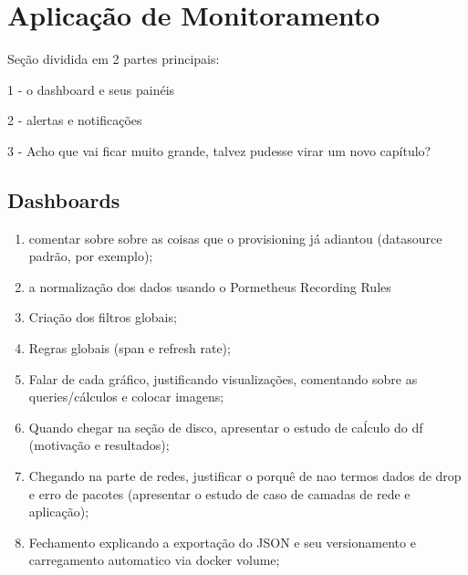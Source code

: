 \chapter{Aplicação de Monitoramento}
\label{chap4}

{\color{blue}
Seção dividida em 2 partes principais:

1 - o dashboard e seus painéis

2 - alertas e notificações

3 - Acho que vai ficar muito grande, talvez pudesse virar um novo capítulo?

\section{Dashboards}
\label{section:Dashboards}

\begin{enumerate}  
  \item comentar sobre sobre as coisas que o provisioning já adiantou (datasource padrão, por exemplo);
  \item a normalização dos dados usando o Pormetheus Recording Rules
  \item Criação dos filtros globais;
  \item Regras globais (span e refresh rate);
  \item Falar de cada gráfico, justificando visualizações, comentando sobre as queries/cálculos e colocar imagens;
  \item Quando chegar na seção de disco, apresentar o estudo de caĺculo do df (motivação e resultados);
  \item Chegando na parte de redes, justificar o porquê de nao termos dados de drop e erro de pacotes (apresentar o estudo de caso de camadas de rede e aplicação);
  \item Fechamento explicando a exportação do JSON e seu versionamento e carregamento automatico via docker volume;
\end{enumerate}


}
